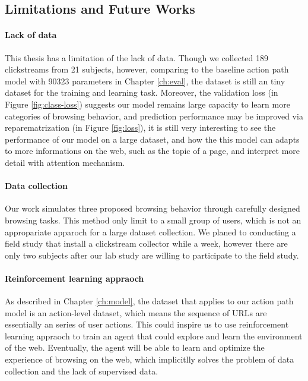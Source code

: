 \paragraph{\emph{}}

\subsection{Limitations and Future Works}

\paragraph{Lack of data} 
This thesis has a limitation of the lack of data. 
Though we collected 189 clickstreams from 21 subjects, however, 
comparing to the baseline action path model with 90323 parameters in Chapter \ref{ch:eval},
the dataset is still an tiny dataset for the training and learning task.
Moreover, the validation loss (in Figure \ref{fig:class-loss}) suggests our model remains large capacity to learn more
categories of browsing behavior, and prediction performance may be improved
via reparematrization (in Figure \ref{fig:loss}), 
it is still very interesting to see the performance of our model on a large dataset,
and how the this model can adapts to more informations on the web, such as the topic of 
a page, and interpret more detail with attention mechanism.

\paragraph{Data collection}
Our work simulates three proposed browsing behavior through carefully designed browsing tasks.
This method only limit to a small group of users, which is not an appropariate apparoch for
a large dataset collection.
We planed to conducting a field study that install a clickstream collector while a week, 
however there are only two subjects after our lab study
are willing to participate to the field study.

\paragraph{Reinforcement learning appraoch}
As described in Chapter \ref{ch:model}, the dataset that applies to our action path model
is an action-level dataset, which means the sequence of URLs are essentially an series of 
user actions. This could inspire us to use reinforcement learning appraoch to train
an agent that could explore and learn the environment of the web. Eventually,
the agent will be able to learn and optimize the experience of browsing on the web,
which implicitlly solves the problem of data collection and the lack of supervised data.

